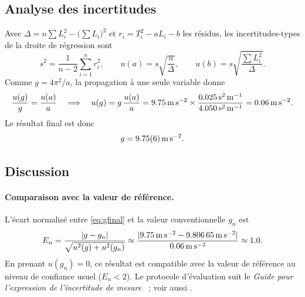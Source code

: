 \begin{analyse}
\subsection{Analyse des incertitudes}

Avec $\Delta=n\sum L_i^{2}-\bigl(\sum L_i\bigr)^{2}$ et $r_i=T_i^{2}-aL_i-b$
les résidus, les incertitudes-types de la droite de régression sont
\begin{equation}
  s^{2}=\frac{1}{n-2}\sum_{i=1}^{n}r_i^{2},
  \qquad
  u(a)=s\sqrt{\frac{n}{\Delta}},
  \qquad
  u(b)=s\sqrt{\frac{\sum L_i^{2}}{\Delta}} .
  \label{eq:regression}
\end{equation}
Comme $g=4\pi^{2}/a$, la propagation à une seule variable donne
\begin{equation}
  \frac{u\mathopen{}\left(g\right)}{g}=\frac{u(a)}{a}
  \quad\Longrightarrow\quad
  u(g)=g\,\frac{u(a)}{a}
  =\qty{9.75}{\metre\per\second\squared}\times\frac{\qty{0.025}{\second\squared\per\metre}}{\qty{4.050}{\second\squared\per\metre}}
  =\qty{0.06}{\metre\per\second\squared}.
  \label{eq:ug}
\end{equation}
Le résultat final est donc
\begin{equation}
  g=\qty{9.75 +- 0.06}{\metre\per\second\squared}.
  \label{eq:gfinal}
\end{equation}

\subsection{Discussion}\label{sec:discussion}

\paragraph{Comparaison avec la valeur de référence.}
L'écart normalisé entre \cref{eq:gfinal} et la valeur conventionnelle $g_{n}$ est
\begin{equation}
  E_{n}=\frac{\lvert g-g_{n}\rvert}{\sqrt{u^{2}\mathopen{}\left(g\right)+u^{2}\mathopen{}\left(g_{n}\right)}}\approx
  \frac{\lvert\qty{9.75}{\metre\per\second\squared}-\qty{9.80665}{\metre\per\second\squared}\rvert}
       {\qty{0.06}{\metre\per\second\squared}}\approx\num{1.0}.
  \label{eq:En}
\end{equation}
En prenant $u(g_{n})=0$, ce résultat est compatible avec la valeur de
référence au niveau de confiance usuel ($E_{n}<2$). Le protocole
d'évaluation suit le \emph{Guide pour l'expression de
l'incertitude de mesure}~\cite{jcgm2008} ; voir aussi \cite{taylor1997}.


\end{analyse}
